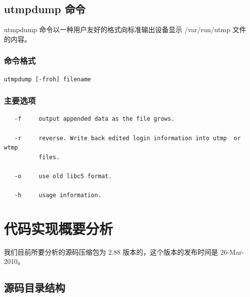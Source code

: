 \subsection{utmpdump 命令}

utmpdump 命令以一种用户友好的格式向标准输出设备显示 /var/run/utmp
文件的内容。

\subsubsection{命令格式}

{\begin{shaded}\begin{verbatim}
utmpdump [-froh] filename
\end{verbatim}\end{shaded}}
\subsubsection{主要选项}

{\begin{shaded}\begin{verbatim}
   -f     output appended data as the file grows.

   -r     reverse. Write back edited login information into utmp  or  wtmp
          files.

   -o     use old libc5 format.

   -h     usage information.
\end{verbatim}\end{shaded}}
\section{代码实现概要分析}

我们目前所要分析的源码压缩包为 2.88 版本的，这个版本的发布时间是
26-Mar-2010。

\subsection{源码目录结构}

